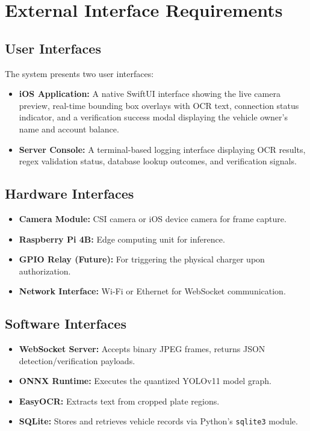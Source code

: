 \section{External Interface Requirements}
\subsection{User Interfaces}
The system presents two user interfaces:
\begin{itemize}
    \item \textbf{iOS Application:} A native SwiftUI interface showing the live camera preview, real-time bounding box overlays with OCR text, connection status indicator, and a verification success modal displaying the vehicle owner's name and account balance.
    \item \textbf{Server Console:} A terminal-based logging interface displaying OCR results, regex validation status, database lookup outcomes, and verification signals.
\end{itemize}

\subsection{Hardware Interfaces}
\begin{itemize}
    \item \textbf{Camera Module:} CSI camera or iOS device camera for frame capture.
    \item \textbf{Raspberry Pi 4B:} Edge computing unit for inference.
    \item \textbf{GPIO Relay (Future):} For triggering the physical charger upon authorization.
    \item \textbf{Network Interface:} Wi-Fi or Ethernet for WebSocket communication.
\end{itemize}

\subsection{Software Interfaces}
\begin{itemize}
    \item \textbf{WebSocket Server:} Accepts binary JPEG frames, returns JSON detection/verification payloads.
    \item \textbf{ONNX Runtime:} Executes the quantized YOLOv11 model graph.
    \item \textbf{EasyOCR:} Extracts text from cropped plate regions.
    \item \textbf{SQLite:} Stores and retrieves vehicle records via Python's \texttt{sqlite3} module.
\end{itemize}

